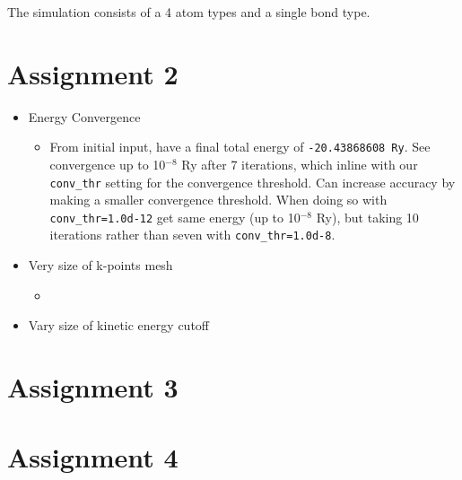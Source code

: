\documentclass[10pt,a4paper]{labreport}
\begin{document}
\begin{enumerate}
\begin{itemize}
  \end{itemize}
  
  The simulation consists of a 4 atom types and a single bond type. 
\end{enumerate}

\section*{Assignment 2}
\begin{itemize}
  \item Energy Convergence
  \begin{itemize}
    \item From initial input, have a final total energy of \texttt{-20.43868608 Ry}. See convergence up to 10$^{-8}$ Ry after 7 iterations, which inline with our \texttt{conv\_thr} setting for the convergence threshold. Can increase accuracy by making a smaller convergence threshold. When doing so with \texttt{conv\_thr=1.0d-12} get same energy (up to 10$^{-8}$ Ry), but taking 10 iterations rather than seven with  \texttt{conv\_thr=1.0d-8}.
  \end{itemize}
  \item Very size of k-points mesh
  \begin{itemize}
    \item 
  \end{itemize}
  \item Vary size of kinetic energy cutoff
\end{itemize}
\section*{Assignment 3}

\section*{Assignment 4}



\newpage

%   
\end{document}
